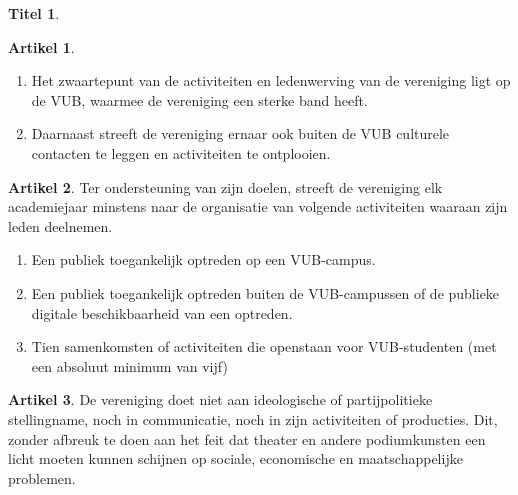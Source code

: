 \documentclass[a4paper,10pt]{article}
\theoremstyle{definition}
\newtheorem{titel}{\newline\Large Titel}
\newtheorem{artikel}{\large Artikel}
\newcommand{\ttextcr}{\hfill\newline}
\newcommand{\ttextenum}{\mbox{}}
\begin{document}
\begin{titel}
  \begin{artikel}\ttextenum
    \begin{enumerate}
      \item
        Het zwaartepunt van de activiteiten en ledenwerving van de vereniging ligt op de VUB, waarmee de vereniging een sterke band heeft.
      \item
        Daarnaast streeft de vereniging ernaar ook buiten de VUB culturele contacten te leggen en activiteiten te ontplooien.
    \end{enumerate}
  \end{artikel}

  \begin{artikel}\ttextcr
    Ter ondersteuning van zijn doelen, streeft de vereniging elk academiejaar minstens naar de organisatie van volgende activiteiten waaraan zijn leden deelnemen.
    \begin{enumerate}
      \item Een publiek toegankelijk optreden op een VUB-campus.
      \item Een publiek toegankelijk optreden buiten de VUB-campussen of de publieke digitale beschikbaarheid van een optreden.
      \item Tien samenkomsten of activiteiten die openstaan voor VUB-studenten (met een absoluut minimum van vijf) %
    \end{enumerate}
  \end{artikel}

  \begin{artikel}\ttextcr
    De vereniging doet niet aan ideologische of partijpolitieke stellingname, noch in communicatie, noch in zijn activiteiten of producties.
    Dit, zonder afbreuk te doen aan het feit dat theater en andere podiumkunsten een licht moeten kunnen schijnen op sociale, economische en maatschappelijke problemen.
  \end{artikel}

\end{titel}

\end{document}
